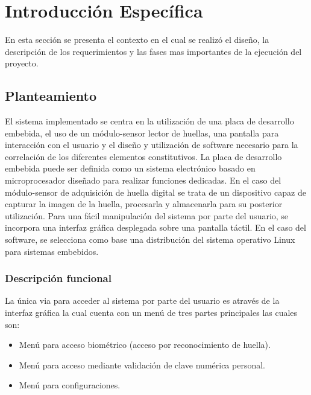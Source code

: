 \chapter{Introducción Específica} %

\label{Chapter2}

En esta sección se presenta el contexto en el cual se realizó el diseño, la descripción de los requerimientos y las fases mas importantes de la ejecución del proyecto.
\section{Planteamiento}
El sistema implementado se centra en la utilización de una placa de desarrollo embebida, el uso de un módulo-sensor lector de huellas, una pantalla para interacción con el usuario y el diseño y utilización de software necesario para la correlación de los diferentes elementos constitutivos.
La placa de desarrollo embebida puede ser definida como un sistema electrónico basado en microprocesador diseñado para realizar funciones 	dedicadas.
En el caso del módulo-sensor de adquisición de huella digital se trata de un dispositivo capaz de capturar la imagen de la huella, procesarla y almacenarla para su posterior utilización.
Para una fácil manipulación del sistema por parte del usuario, se incorpora una interfaz gráfica desplegada sobre una pantalla táctil.
En el caso del software, se selecciona como base una distribución del sistema operativo Linux para sistemas embebidos.
\subsection{Descripción funcional}
La única via para acceder al sistema por parte del usuario es através de la interfaz gráfica la cual cuenta con un menú  de tres partes principales las cuales son:

\begin{itemize}
\item Menú para acceso biométrico (acceso por reconocimiento de huella).	
\item Menú para acceso mediante validación de clave numérica personal.
\item Menú para configuraciones.
\end{itemize}

